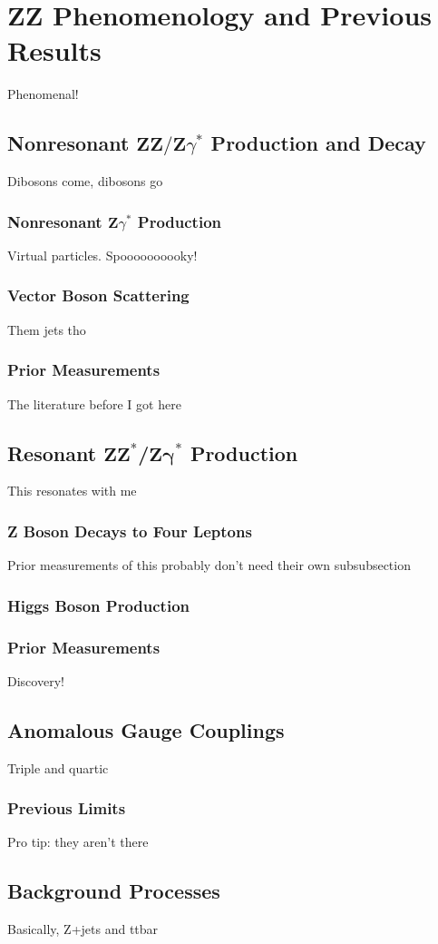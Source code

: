 \chapter{ZZ Phenomenology and Previous Results}
Phenomenal!

\section{Nonresonant
         \texorpdfstring{$\mathbf{ZZ/Z}\gamma^\ast$}{ZZ/Zgamma*}
         Production and Decay}
Dibosons come, dibosons go

\subsection{Nonresonant
            \texorpdfstring{$\mathbf{Z}\gamma^\ast$}{Zgamma*}
            Production}
Virtual particles. Spoooooooooky!

\subsection{Vector Boson Scattering}
Them jets tho

\subsection{Prior Measurements}
The literature before I got here


\section{Resonant
         \texorpdfstring{$\mathbf{ZZ}^\ast$/$\mathbf{Z\gamma}^\ast$}
         {ZZ*/Zgamma*}
         Production
         }
This resonates with me

\subsection{Z Boson Decays to Four Leptons}
Prior measurements of this probably don't need their own subsubsection


\subsection{Higgs Boson Production}

\subsection{Prior Measurements}
Discovery!



\section{Anomalous Gauge Couplings}
Triple and quartic

\subsection{Previous Limits}
Pro tip: they aren't there



\section{Background Processes}
Basically, Z+jets and ttbar
